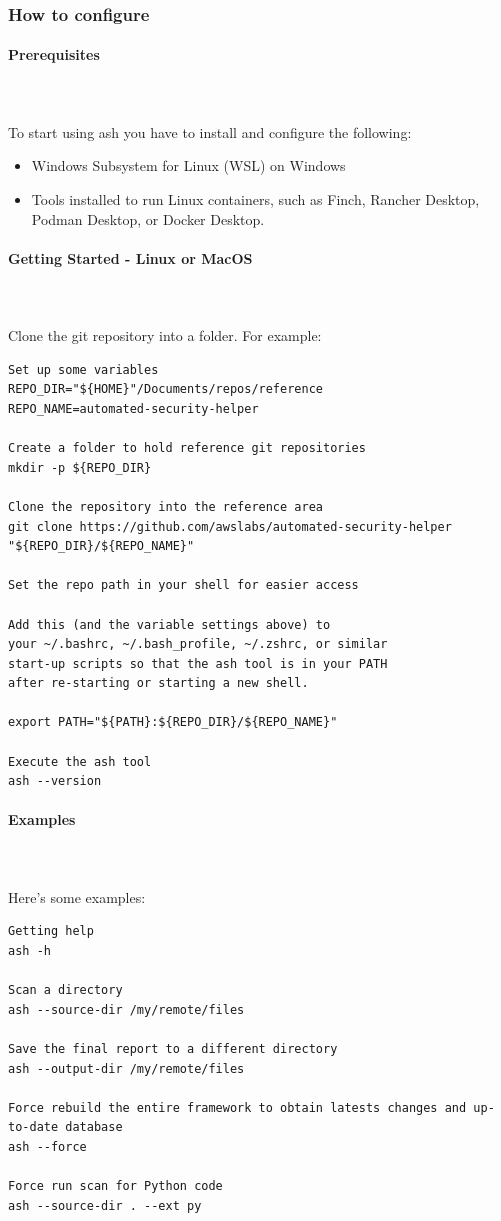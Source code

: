 \documentclass[]{article}
\begin{document}
\subsubsection{How to configure}
\paragraph{Prerequisites} \mbox{} \\ \\
To start using ash you have to install and configure the following:
\begin{itemize}
\item Windows Subsystem for Linux (WSL) on Windows 
\item Tools installed to run Linux containers, such as Finch, Rancher Desktop, Podman Desktop, or Docker Desktop.
\end{itemize}

\paragraph{Getting Started - Linux or MacOS} \mbox{} \\ \\
Clone the git repository into a folder. For example:

\begin{lstlisting}[numbers=none]
Set up some variables
REPO_DIR="${HOME}"/Documents/repos/reference
REPO_NAME=automated-security-helper

Create a folder to hold reference git repositories
mkdir -p ${REPO_DIR}

Clone the repository into the reference area
git clone https://github.com/awslabs/automated-security-helper "${REPO_DIR}/${REPO_NAME}"

Set the repo path in your shell for easier access

Add this (and the variable settings above) to
your ~/.bashrc, ~/.bash_profile, ~/.zshrc, or similar
start-up scripts so that the ash tool is in your PATH
after re-starting or starting a new shell.

export PATH="${PATH}:${REPO_DIR}/${REPO_NAME}"

Execute the ash tool
ash --version
\end{lstlisting}

\paragraph{Examples} \mbox{} \\ \\
Here's some examples:
\begin{lstlisting}[numbers=none]
Getting help
ash -h

Scan a directory
ash --source-dir /my/remote/files

Save the final report to a different directory
ash --output-dir /my/remote/files

Force rebuild the entire framework to obtain latests changes and up-to-date database
ash --force

Force run scan for Python code
ash --source-dir . --ext py
\end{lstlisting}
\end{document}

